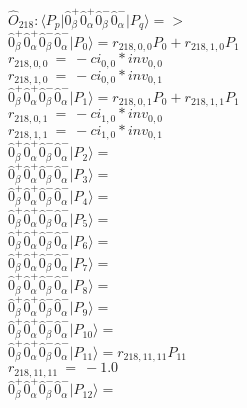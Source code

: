 \documentclass[14pt]{article}
\begin{document}
    $\hat{O}_{218}:  \langle{P_p}\vert \hat{0}_{\beta}^{+}\hat{0}_{\alpha}^{+}\hat{0}_{\beta}^{-}\hat{0}_{\alpha}^{-} \vert{P_q}\rangle => $ \\ 
    $ \hat{0}_{\beta}^{+}\hat{0}_{\alpha}^{+}\hat{0}_{\beta}^{-}\hat{0}_{\alpha}^{-} \vert{P_{0}}\rangle = {r}_{218,0,0}P_{0}+{r}_{218,1,0}P_{1} $ \\ 
    ${r}_{218,0,0}\ =\ -{ci}_{0,0}*{inv}_{0,0} $ \\ 
    ${r}_{218,1,0}\ =\ -{ci}_{0,0}*{inv}_{0,1} $ \\ 
    $ \hat{0}_{\beta}^{+}\hat{0}_{\alpha}^{+}\hat{0}_{\beta}^{-}\hat{0}_{\alpha}^{-} \vert{P_{1}}\rangle = {r}_{218,0,1}P_{0}+{r}_{218,1,1}P_{1} $ \\ 
    ${r}_{218,0,1}\ =\ -{ci}_{1,0}*{inv}_{0,0} $ \\ 
    ${r}_{218,1,1}\ =\ -{ci}_{1,0}*{inv}_{0,1} $ \\ 
    $ \hat{0}_{\beta}^{+}\hat{0}_{\alpha}^{+}\hat{0}_{\beta}^{-}\hat{0}_{\alpha}^{-} \vert{P_{2}}\rangle =  $ \\ 
    $ \hat{0}_{\beta}^{+}\hat{0}_{\alpha}^{+}\hat{0}_{\beta}^{-}\hat{0}_{\alpha}^{-} \vert{P_{3}}\rangle =  $ \\ 
    $ \hat{0}_{\beta}^{+}\hat{0}_{\alpha}^{+}\hat{0}_{\beta}^{-}\hat{0}_{\alpha}^{-} \vert{P_{4}}\rangle =  $ \\ 
    $ \hat{0}_{\beta}^{+}\hat{0}_{\alpha}^{+}\hat{0}_{\beta}^{-}\hat{0}_{\alpha}^{-} \vert{P_{5}}\rangle =  $ \\ 
    $ \hat{0}_{\beta}^{+}\hat{0}_{\alpha}^{+}\hat{0}_{\beta}^{-}\hat{0}_{\alpha}^{-} \vert{P_{6}}\rangle =  $ \\ 
    $ \hat{0}_{\beta}^{+}\hat{0}_{\alpha}^{+}\hat{0}_{\beta}^{-}\hat{0}_{\alpha}^{-} \vert{P_{7}}\rangle =  $ \\ 
    $ \hat{0}_{\beta}^{+}\hat{0}_{\alpha}^{+}\hat{0}_{\beta}^{-}\hat{0}_{\alpha}^{-} \vert{P_{8}}\rangle =  $ \\ 
    $ \hat{0}_{\beta}^{+}\hat{0}_{\alpha}^{+}\hat{0}_{\beta}^{-}\hat{0}_{\alpha}^{-} \vert{P_{9}}\rangle =  $ \\ 
    $ \hat{0}_{\beta}^{+}\hat{0}_{\alpha}^{+}\hat{0}_{\beta}^{-}\hat{0}_{\alpha}^{-} \vert{P_{10}}\rangle =  $ \\ 
    $ \hat{0}_{\beta}^{+}\hat{0}_{\alpha}^{+}\hat{0}_{\beta}^{-}\hat{0}_{\alpha}^{-} \vert{P_{11}}\rangle = {r}_{218,11,11}P_{11} $ \\ 
    ${r}_{218,11,11}\ =\ -1.0 $ \\ 
    $ \hat{0}_{\beta}^{+}\hat{0}_{\alpha}^{+}\hat{0}_{\beta}^{-}\hat{0}_{\alpha}^{-} \vert{P_{12}}\rangle =  $ \\ 
\end{document}
